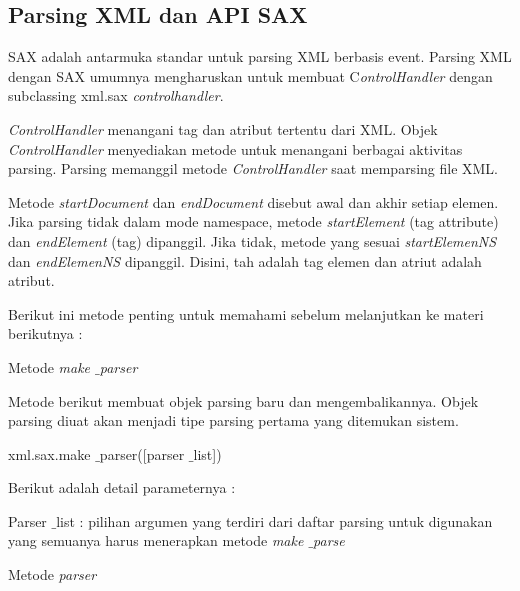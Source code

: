 \documentclass{wileySix}
\begin{document}
\begin{myEnumerate}
\section{Parsing XML dan API SAX}
\par
\noindent 
\hspace*{0.5in} SAX adalah antarmuka standar untuk parsing XML berbasis event. Parsing XML dengan SAX umumnya mengharuskan untuk membuat C\textit{ontrolHandler }dengan subclassing xml.sax \textit{controlhandler}. \par
\noindent 
\hspace*{0.5in} \textit{ControlHandler }menangani tag dan atribut tertentu dari XML. Objek \textit{ControlHandler }menyediakan metode untuk menangani berbagai aktivitas parsing. Parsing memanggil metode \textit{ControlHandler }saat memparsing file XML. \par
\noindent 
\hspace*{0.5in} Metode \textit{startDocument} dan \textit{endDocument} disebut awal dan akhir setiap elemen. Jika parsing tidak dalam mode namespace, metode \textit{startElement} (tag attribute) dan \textit{endElement} (tag) dipanggil. Jika tidak, metode yang sesuai \textit{startElemenNS} dan \textit{endElemenNS} dipanggil. Disini, tah adalah tag elemen dan atriut adalah atribut.  \par
\noindent 
\hspace*{0.5in} Berikut ini metode penting untuk memahami sebelum melanjutkan ke materi berikutnya : \par
\noindent 
\begin{myEnumerate}
	\item Metode \textit{make $  \_  $parser} \par
	Metode berikut membuat objek parsing baru dan mengembalikannya. Objek parsing diuat akan menjadi tipe parsing pertama yang ditemukan sistem.  \par
	\vspace{10pt}
	{\fontsize{10pt}{10pt}\selectfont xml.sax.make $  \_  $parser([parser $  \_  $list])} \par
	\vspace{12pt}
	Berikut adalah detail parameternya : \par
	Parser $  \_  $list : pilihan argumen yang terdiri dari daftar parsing untuk digunakan yang semuanya harus menerapkan metode \textit{make $  \_  $parse} \par
	\noindent 
	\item Metode \textit{parser} \par

\end{myEnumerate}
\end{myEnumerate}
\end{document}
